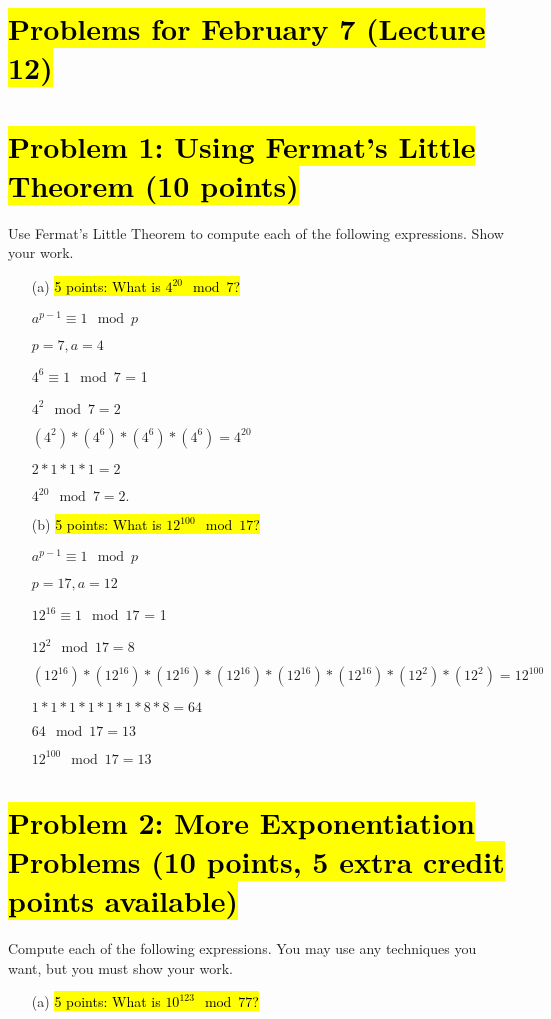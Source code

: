 \documentclass[12pt]{article}
\begin{document}
\section{\hl{Problems for February 7 (Lecture 12)}}
\section*{\hl{Problem 1: Using Fermat's Little Theorem (10 points)}}
Use Fermat's Little Theorem to compute each of the following expressions. Show your
work.
\begin{enumerate}
\item[(a)] \hl{5 points: What is $4^{20} \mod 7$?}

\item[\rightarrow] $a^{p-1} \equiv 1 \mod p$
\item[\rightarrow] $p = 7, a = 4$
\item[\rightarrow] $4^{6} \equiv 1 \mod 7$ = 1
\item[\rightarrow] $4^{2} \mod 7 = 2$
\item[\rightarrow] $(4^{2})*(4^{6})*(4^{6})*(4^{6}) = 4^{20}$
\item[\rightarrow] $2*1*1*1 = 2$
\item[\Longrightarrow] $4^{20} \mod 7 = 2.$

\item[(b)] \hl{5 points: What is $12^{100} \mod 17$?}

\item[\rightarrow] $a^{p-1} \equiv 1 \mod p$
\item[\rightarrow] $p = 17, a = 12$
\item[\rightarrow] $12^{16} \equiv 1 \mod 17$ = 1
\item[\rightarrow] $12^{2} \mod 17 = 8$
\item[\rightarrow] $(12^{16})*(12^{16})*(12^{16})*(12^{16})*(12^{16})*(12^{16})*(12^{2})*(12^{2})= 12^{100}$
\item[\rightarrow] $1*1*1*1*1*1*8*8 = 64$
\item[\rightarrow] $64 \mod 17 = 13$
\item[\Longrightarrow] $12^{100} \mod 17 = 13$


\end{enumerate}

\section*{\hl{Problem 2: More Exponentiation Problems (10 points, 5 extra credit points
available)}}
Compute each of the following expressions. You may use any techniques you want, but
you must show your work. 
\begin{enumerate}
\item[(a)] \hl{5 points: What is $10^{123} \mod 77$?}
\end{enumerate}
\end{document}

